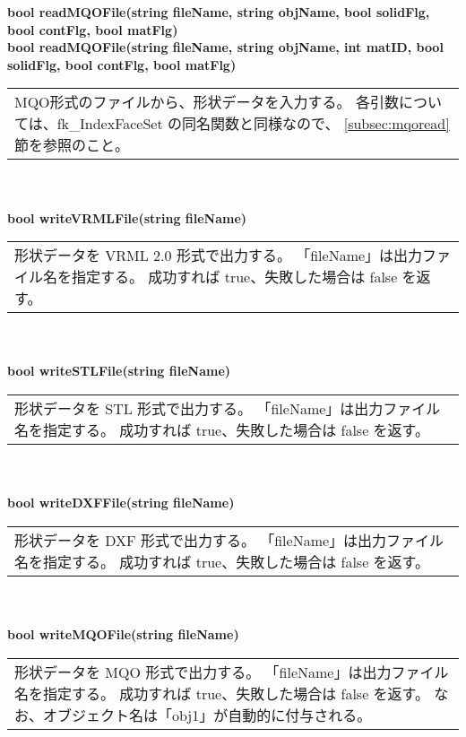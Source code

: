 \begin{tabbing}
\> {\footnotesize \bf bool readMQOFile(string fileName,
	string objName, bool solidFlg, bool contFlg, bool matFlg)} \\
\> {\footnotesize \bf bool readMQOFile(string fileName,
	string objName, int matID, bool solidFlg, bool contFlg, bool matFlg)} \\
	\> \> \begin{tabular}{p{15cm}}
		MQO形式のファイルから、形状データを入力する。
		各引数については、fk\_IndexFaceSet の同名関数と同様なので、
		\ref{subsec:mqoread}節を参照のこと。
	\end{tabular} \\ \\

\> \textbf{bool writeVRMLFile(string fileName)} \\
	\> \> \begin{tabular}{p{15cm}}
		形状データを VRML 2.0 形式で出力する。
		「fileName」は出力ファイル名を指定する。
		成功すれば true、失敗した場合は false を返す。
	\end{tabular} \\ \\

\> \textbf{bool writeSTLFile(string fileName)} \\
	\> \> \begin{tabular}{p{15cm}}
		形状データを STL 形式で出力する。
		「fileName」は出力ファイル名を指定する。
		成功すれば true、失敗した場合は false を返す。
	\end{tabular} \\ \\

\> \textbf{bool writeDXFFile(string fileName)} \\
	\> \> \begin{tabular}{p{15cm}}
		形状データを DXF 形式で出力する。
		「fileName」は出力ファイル名を指定する。
		成功すれば true、失敗した場合は false を返す。
	\end{tabular} \\ \\

\> \textbf{bool writeMQOFile(string fileName)} \\
	\> \> \begin{tabular}{p{15cm}}
		形状データを MQO 形式で出力する。
		「fileName」は出力ファイル名を指定する。
		成功すれば true、失敗した場合は false を返す。
		なお、オブジェクト名は「obj1」が自動的に付与される。		
	\end{tabular}
\end{tabbing}
